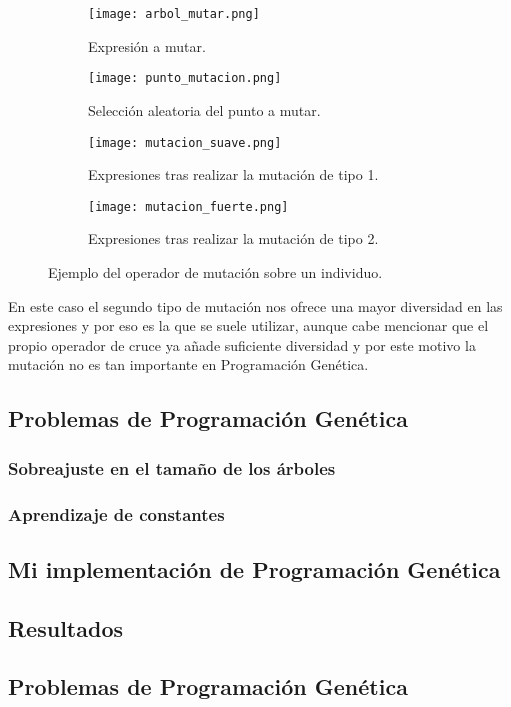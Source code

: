 \begin{figure}[H]
    \centering
	 \begin{subfigure}[b]{0.49\textwidth}
		 \centering
		 \texttt{[image: arbol\_mutar.png]}
		 \caption{Expresión a mutar.}
		 \label{fig:arbol_mutar}
	 \end{subfigure}
	\begin{subfigure}[b]{0.49\textwidth}
		 \centering
		\texttt{[image: punto\_mutacion.png]}
		\caption{Selección aleatoria del punto a mutar.}
		\label{fig:punto_mutacion}
   \end{subfigure}

	\begin{subfigure}[b]{0.49\textwidth}
		\centering
	  \texttt{[image: mutacion\_suave.png]}
	  \caption{Expresiones tras realizar la mutación de tipo 1.}
	  \label{fig:mutacion_suave}
   \end{subfigure}
	\begin{subfigure}[b]{0.49\textwidth}
		\centering
	  \texttt{[image: mutacion\_fuerte.png]}
	  \caption{Expresiones tras realizar la mutación de tipo 2.}
	  \label{fig:mutacion_fuerte}
	\end{subfigure}

	\caption{Ejemplo del operador de mutación sobre un individuo.}
	\label{fig:ej_mutacion_GP}
\end{figure}

En este caso el segundo tipo de mutación nos ofrece una mayor diversidad en las expresiones y por eso es la que se suele utilizar, aunque cabe mencionar que el propio operador de cruce ya añade suficiente diversidad y por este motivo la mutación no es tan importante en Programación Genética.

\subsection{Problemas de Programación Genética}

\subsubsection{Sobreajuste en el tamaño de los árboles}

\subsubsection{Aprendizaje de constantes}


\subsection{Mi implementación de Programación Genética}

\subsection{Resultados}

\subsection{Problemas de Programación Genética}

